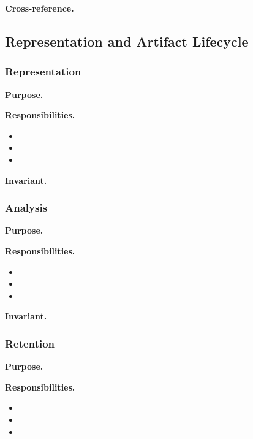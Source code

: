   \textbf{Cross-reference.} %

\subsection{Representation and Artifact Lifecycle}

  \subsubsection{Representation}
  \textbf{Purpose.} %

  \textbf{Responsibilities.}
  \begin{itemize}
    \item %
    \item %
    \item %
  \end{itemize}

  \textbf{Invariant.} %

  \subsubsection{Analysis}
  \textbf{Purpose.} %

  \textbf{Responsibilities.}
  \begin{itemize}
    \item %
    \item %
    \item %
  \end{itemize}

  \textbf{Invariant.} %

  \subsubsection{Retention}
  \textbf{Purpose.} %

  \textbf{Responsibilities.}
  \begin{itemize}
    \item %
    \item %
    \item %
  \end{itemize}

